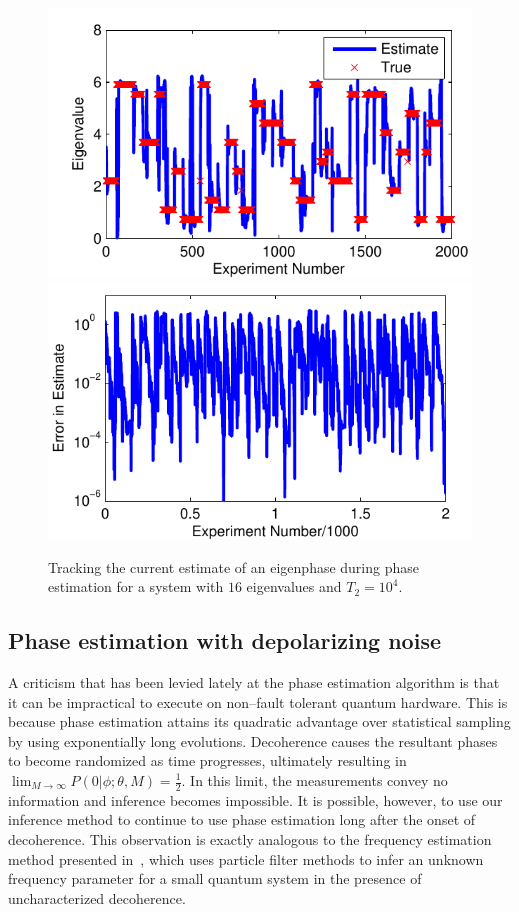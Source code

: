 \documentclass[aps,pra,amsmath,twocolumn,amssymb,superscriptaddress]{revtex4-1}
\begin{document}





\begin{figure}
    \begin{centering}
\includegraphics[width=0.4\linewidth]{Errtrack1.pdf}
\hspace{5mm}
        \includegraphics[width=0.4\linewidth]{Errtrack2.pdf}
    \end{centering}
    \caption{\label{fig:Errplot}
Tracking the current estimate of an eigenphase  during phase estimation for a system with $16$ eigenvalues and $T_2=10^4$.
    }
\end{figure}

\subsection{Phase estimation with depolarizing noise}
A criticism that has been levied lately at the phase estimation algorithm is that it can be impractical to execute on non--fault tolerant quantum hardware.  This is because phase estimation attains its quadratic advantage over statistical sampling by using exponentially long evolutions.  Decoherence causes the resultant phases to become randomized as time progresses, ultimately resulting in
$\lim_{M\rightarrow \infty} P(0|\phi;\theta,M) = \frac{1}{2}$.
In this limit, the measurements convey no information and inference becomes impossible.  It is possible, however, to use our inference method to continue to use phase estimation long after the onset of decoherence.  This observation is exactly analogous to the frequency estimation method presented in~\cite{granade_robust_2012}, which uses particle filter methods to infer an unknown frequency parameter for a small quantum system in the presence of uncharacterized decoherence.
\end{document}
